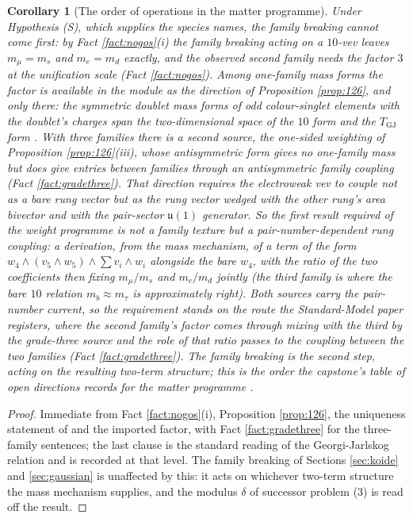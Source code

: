 \documentclass[11pt]{article}
\newtheorem{corollary}[theorem]{Corollary}
\theoremstyle{definition}
\newcommand{\uu}{\mathfrak{u}}
\begin{document}
\begin{corollary}[The order of operations in the matter programme]\label{cor:order}
Under Hypothesis (S), which supplies the species names, the family breaking cannot come first: by Fact \ref{fact:nogos}(i) the family breaking acting on a $10$-vev leaves $m_{\mu} = m_{s}$ and $m_{e} = m_{d}$ exactly, and the observed second family needs the factor $3$ at the unification scale (Fact \ref{fact:nogos}). Among one-family mass forms the factor is available in the module as the direction of Proposition \ref{prop:126}, and only there: the symmetric doublet mass forms of odd colour-singlet elements with the doublet's charges span the two-dimensional space of the $10$ form and the $T_{\mathrm{GJ}}$ form \cite[Prop.~9.32]{ButlerT12}. With three families there is a second source, the one-sided weighting of Proposition \ref{prop:126}(iii), whose antisymmetric form gives no one-family mass but does give entries between families through an antisymmetric family coupling (Fact \ref{fact:gradethree}). That direction requires the electroweak vev to couple not as a bare rung vector but as the rung vector wedged with the other rung's area bivector and with the pair-sector $\uu(1)$ generator. So the first result required of the weight programme is not a family texture but a \emph{pair-number-dependent rung coupling}: a derivation, from the mass mechanism, of a term of the form $w_{4}\wedge(v_{5}\wedge w_{5})\wedge\sum v_{i}\wedge w_{i}$ alongside the bare $w_{4}$, with the ratio of the two coefficients then fixing $m_{\mu}/m_{s}$ and $m_{e}/m_{d}$ jointly (the third family is where the bare $10$ relation $m_{b} \approx m_{\tau}$ is approximately right). Both sources carry the pair-number current, so the requirement stands on the route the Standard-Model paper registers, where the second family's factor comes through mixing with the third by the grade-three source and the role of that ratio passes to the coupling between the two families (Fact \ref{fact:gradethree}). The family breaking is the second step, acting on the resulting two-term structure; this is the order the capstone's table of open directions records for the matter programme \cite[Table~4]{ButlerT17}.
\end{corollary}

\begin{proof}
Immediate from Fact \ref{fact:nogos}(i), Proposition \ref{prop:126}, the uniqueness statement of \cite[Prop.~9.32]{ButlerT12} and the imported factor, with Fact \ref{fact:gradethree} for the three-family sentences; the last clause is the standard reading of the Georgi-Jarlskog relation and is recorded at that level. The family breaking of Sections \ref{sec:koide} and \ref{sec:gaussian} is unaffected by this: it acts on whichever two-term structure the mass mechanism supplies, and the modulus $\delta$ of successor problem (3) is read off the result.
\end{proof}
\end{document}
